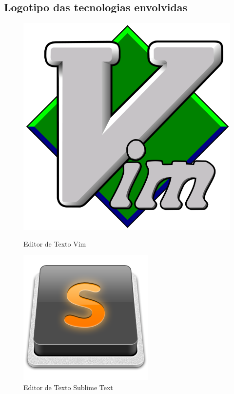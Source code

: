 \documentclass[12pt]{article}
\begin{document}
\subsection{Logotipo das tecnologias envolvidas}
\begin{figure}[!htb]
	\centering
	\begin{minipage}{0.5\textwidth}
		\centering
		\includegraphics[scale=0.15]{logo-vim.png}
		\caption{Editor de Texto Vim}
		\label{Vim logo}
	\end{minipage}%
	\begin{minipage}{0.5\textwidth}
		\centering
		\includegraphics[scale=0.3]{logo-sublime-text.png}
		\caption{Editor de Texto Sublime Text}
		\label{Sublime Text logo}
	\end{minipage}
\end{figure}
\end{document}
